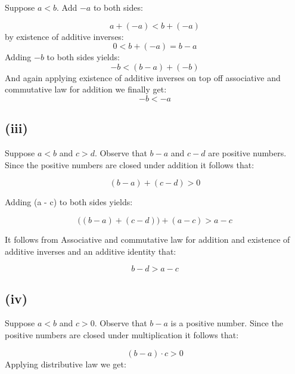 \documentclass{article}
\begin{document}
Suppose \(a < b\). Add \(-a\) to both sides:

\begin{equation*}
	a + (-a) < b + (-a)
\end{equation*}
by existence of additive inverses:
\begin{equation*}
	0 < b + (-a) = b - a
\end{equation*}
Adding \(-b\) to both sides yields:
\begin{equation*}
	-b < (b - a) + (-b)
\end{equation*}
And again applying existence of additive inverses on top off associative and commutative law for addition we finally get:
\begin{equation*}
	-b < -a
\end{equation*}

\subsection*{(iii)}

Suppose \(a < b\) and \(c > d\). Observe that \(b - a\) and \(c - d\) are positive numbers. Since the positive numbers are closed
under addition it follows that:

\begin{equation*}
	(b - a) + (c - d) > 0
\end{equation*}

Adding (a - c) to both sides yields:

\begin{equation*}
	\Big((b - a) + (c - d)\Big) + (a - c) > a - c
\end{equation*}

It follows from Associative and commutative law for addition and existence of additive inverses and an
additive identity that:

\begin{equation*}
	b - d > a - c
\end{equation*}

\subsection*{(iv)}

Suppose \(a < b\) and \(c > 0\). Observe that \(b - a\) is a positive number.
Since the positive numbers are closed under multiplication it follows that:

\begin{equation*}
	(b-a) \cdot c > 0
\end{equation*}
Applying distributive law we get:
\end{document}
